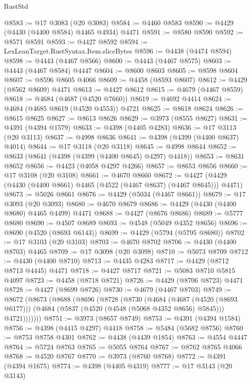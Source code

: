 \begin{lexlean}{RustStd}
\begin{coremodule}
@8583 := @17 @3083 (@20 @3083)
@8584 := @4460 @8583
@8590 := @4429 (@4430 (@4400 @8584) @4465 @4934) @4471
@8591 := @8580 @8590
@8592 := @8571 @8591
@8593 := @4427 @8592
@8594 := LexLeanTarget.RustSyntax.Item.sliceBytes
@8596 := @4438 (@4474 @8594)
@8598 := @4443 (@4467 @8566)
@8600 := @4443 (@4467 @8575)
@8603 := @4443 (@4467 @8584) @4447
@8604 := @8600 @8603
@8605 := @8598 @8604
@8607 := @8596 @8605 @4066
@8609 := @4458 (@8593 @8607)
@8612 := @4429 (@8562 @8609) @4471
@8613 := @4427 @8612
@8615 := @4679 (@4467 @8559)
@8618 := @4684 (@4687 (@4520 @7660))
@8619 := @4692 @4414
@8624 := @4684 (@4685 @8619 (@4520 @4553)) @4721
@8625 := @8618 @8624
@8626 := @8615 @8625
@8627 := @8613 @8626
@8629 := @3973 (@8555 @8627)
@8631 := @4391 (@4394 @1579)
@8633 := @4398 (@4405 @4283)
@8636 := @17 @3113 (@20 @3113)
@8637 := @4998 @8636
@8641 := @4398 (@4399 (@4400 @8637) @4014)
@8644 := @17 @3118 (@20 @3118)
@8645 := @4998 @8644
@8652 := @8633 (@8641 (@4398 (@4399 (@4400 @8645) @4297) @4418))
@8653 := @8631 @8652
@8656 := @4423 (@4058 @4297 @4266)
@8657 := @8653 @8656
@8660 := @17 @3108 (@20 @3108)
@8661 := @4670 @8660
@8672 := @4427 (@4429 (@4430 (@4400 @8661) @4465 (@4522 (@4467 @8637) (@4467 @8645))) @4471)
@8673 := @5026 @8661
@8676 := @4429 (@5034 (@4467 @8661))
@8679 := @17 @3093 (@20 @3093)
@8680 := @4670 @8679
@8686 := @4429 (@4430 (@4400 @8680) @4465 @4499) @4471
@8688 := @4427 (@8676 @8686)
@8689 := @5777 @8680
@8690 := @4507 @8689
@8693 := @4548 (@5049 @4352 @8656)
@8696 := @8690 (@4520 (@8693 @6143))
@8699 := @4429 (@5794 (@5795 @8680))
@8702 := @17 @3103 (@20 @3103)
@8703 := @4670 @8702
@8706 := @4430 (@4400 @8703) @4465
@8709 := @17 @3098 (@20 @3098)
@8710 := @5073 @8709
@8712 := @4430 (@4400 @8710)
@8713 := @4435 @4283
@8717 := @4429 (@8712 @8713 @4445) @4471
@8718 := @4427 @8717
@8721 := @5083 @8710 @5815 @4097
@8723 := @4458 (@8718 @8721)
@8726 := @4429 (@8706 @8723) @4471
@8728 := @4427 (@8699 @8726)
@8730 := @4679 (@4467 @8703)
@8749 := @8672
    (@8673
      (@8688
        (@8696
          (@8728
            (@8730
              (@4684
                (@4687 (@4520 (@8693 @6177)))
                (@4684 (@5837 (@4520 (@4548 (@5068 @4352 @8656) @5845))) @4721)))))))
@8751 := @3973 (@8657 @8749)
@8753 := @4391 (@4394 @1584)
@8756 := @4398 (@4415 @4297) @4418
@8758 := @5484 (@5682 @8756)
@8760 := @8753 @8758 @4301
@8762 := @4438 (@4439 @1854)
@8763 := @4554 @4447
@8764 := @5724 @8763
@8765 := @5055 @8764
@8767 := @8762 @8765 @4066
@8768 := @4520 @8767
@8770 := @3973 (@8760 @8768)
@8772 := @4391 (@4394 @1675)
@8774 := @4398 (@4405 @4319)
@8777 := @17 @3143 (@20 @3143)

\end{coremodule}
\end{lexlean}
